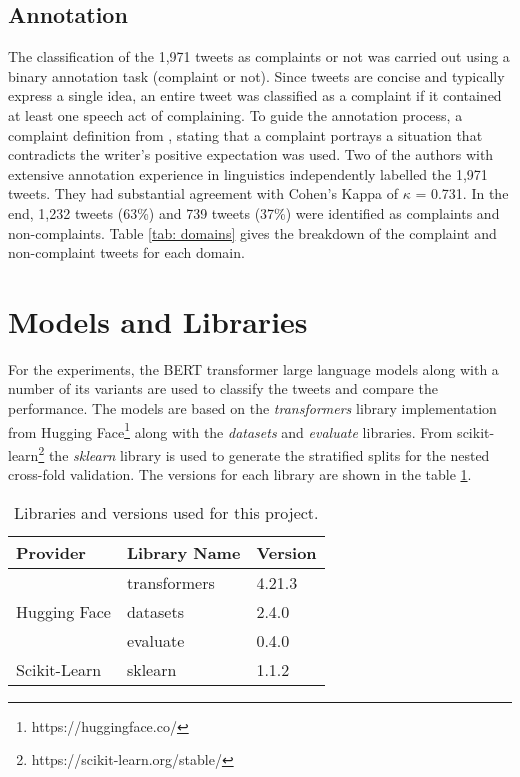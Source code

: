 \subsection{Annotation}
The classification of the 1,971 tweets as complaints or not was carried out using a binary annotation task (complaint or not). Since tweets are concise and typically express a single idea, an entire tweet was classified as a complaint if it contained at least one speech act of complaining. To guide the annotation process, a complaint definition from \cite{olshtain_speechact_1987}, stating that a complaint portrays a situation that contradicts the writer's positive expectation was used. Two of the authors with extensive annotation experience in linguistics independently labelled the 1,971 tweets. They had substantial agreement \cite{artsteinInterCoderAgreementComputational2008} with Cohen's Kappa of $\kappa$ = 0.731. In the end, 1,232 tweets (63\%) and 739 tweets (37\%) were identified as complaints and non-complaints. Table \ref{tab: domains} gives the breakdown of the complaint and non-complaint tweets for each domain.


\section{Models and Libraries}
For the experiments, the BERT transformer large language models along with a number of its variants are used to classify the tweets and compare the performance. The models are based on the \textit{transformers} library implementation from Hugging Face\footnote{https://huggingface.co/} along with the \textit{datasets} and \textit{evaluate} libraries. From scikit-learn\footnote{https://scikit-learn.org/stable/} the \textit{sklearn} library is used to generate the stratified splits for the nested cross-fold validation. The versions for each library are shown in the table \ref{tab: libs_used}.

\begin{table}[ht]
    \captionsetup{font=small}
    \centering
    \begin{tabularx}{\textwidth}{|X|X|X|}
        \hline
        \rowcolor[gray]{0.7}
        \multirow{-3}{*}{} \textbf{Provider} & \textbf{Library Name} & \textbf{Version} \\
        \hline
        \multirow{3}{*}{Hugging Face} & transformers & 4.21.3 \\
        \cline{2-3}
        & datasets & 2.4.0 \\
        \cline{2-3}
        & evaluate & 0.4.0 \\
        \hline
        Scikit-Learn & sklearn & 1.1.2 \\
        \hline
    \end{tabularx}
    \caption{Libraries and versions used for this project.}    
    \label{tab: libs_used}
\end{table}


